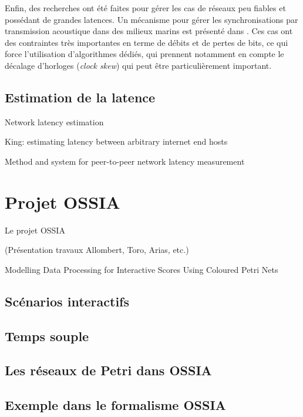 Enfin, des recherches ont été faites pour gérer les cas de réseaux peu fiables et possédant de grandes latences. Un mécanisme pour gérer les synchronisations par transmission acoustique dans des milieux marins est présenté dans \cite{syed2006time}. Ces cas ont des contraintes très importantes en terme de débits et de pertes de bits, ce qui force l'utilisation d'algorithmes dédiés, qui prennent notamment en compte le décalage d'horloges (\textit{clock skew}) qui peut être particulièrement important.
\subsection{Estimation de la latence}
\label{section:latence}
Network latency estimation %

King: estimating latency between arbitrary internet end hosts

Method and system for peer-to-peer network latency measurement %


\section{Projet OSSIA}
Le projet \ac{OSSIA}

(Présentation travaux Allombert, Toro, Arias, etc.)

Modelling Data Processing for Interactive Scores Using Coloured Petri Nets


\subsection{Scénarios interactifs}
\subsection{Temps souple}
\subsection{Les réseaux de Petri dans OSSIA}
\subsection{Exemple dans le formalisme OSSIA}

